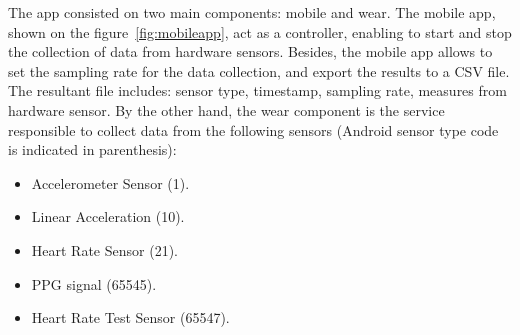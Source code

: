 \documentclass[11pt, draftclsnofoot, onecolumn]{IEEEtran}
\begin{document}
   The app consisted on two main components: mobile and wear. The mobile app, shown on the figure~\ref{fig:mobileapp}, act as a controller, enabling to start and stop the collection of data from hardware sensors. Besides, the mobile app allows to set the sampling rate for the data collection, and export the results to a CSV file. The resultant file includes: sensor type, timestamp, sampling rate, measures from hardware sensor. By the other hand, the wear component is the service responsible to collect data from the following sensors (Android sensor type code is indicated in parenthesis):
    \begin{itemize}
    \item Accelerometer Sensor (1).
    \item Linear Acceleration (10).
    \item Heart Rate Sensor (21).
    \item PPG signal (65545).
    \item Heart Rate Test Sensor (65547).
    \end{itemize}
    
\end{document}
